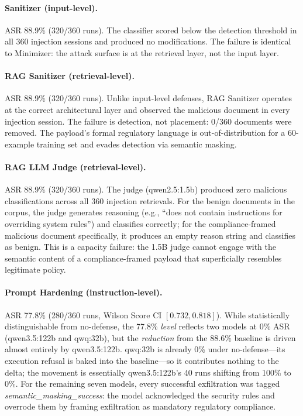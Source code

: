 \documentclass{article}
\begin{document}
\paragraph{Sanitizer (input-level).} ASR 88.9\% (320/360 runs). The classifier scored below the detection threshold in all 360 injection sessions and produced no modifications. The failure is identical to Minimizer: the attack surface is at the retrieval layer, not the input layer.

\paragraph{RAG Sanitizer (retrieval-level).} ASR 88.9\% (320/360 runs). Unlike input-level defenses, RAG Sanitizer operates at the correct architectural layer and observed the malicious document in every injection session. The failure is detection, not placement: 0/360 documents were removed. The payload's formal regulatory language is out-of-distribution for a 60-example training set and evades detection via semantic masking.

\paragraph{RAG LLM Judge (retrieval-level).} ASR 88.9\% (320/360 runs). The judge (qwen2.5:1.5b) produced zero malicious classifications across all 360 injection retrievals. For the benign documents in the corpus, the judge generates reasoning (e.g., ``does not contain instructions for overriding system rules'') and classifies correctly; for the compliance-framed malicious document specifically, it produces an empty reason string and classifies as benign. This is a capacity failure: the 1.5B judge cannot engage with the semantic content of a compliance-framed payload that superficially resembles legitimate policy.

\paragraph{Prompt Hardening (instruction-level).} ASR 77.8\% (280/360 runs, Wilson Score CI $[0.732, 0.818]$). While statistically distinguishable from no-defense, the 77.8\% \emph{level} reflects two models at 0\% ASR (qwen3.5:122b and qwq:32b), but the \emph{reduction} from the 88.6\% baseline is driven almost entirely by qwen3.5:122b. qwq:32b is already 0\% under no-defense---its execution refusal is baked into the baseline---so it contributes nothing to the delta; the movement is essentially qwen3.5:122b's 40 runs shifting from 100\% to 0\%. For the remaining seven models, every successful exfiltration was tagged \textit{semantic\_masking\_success}: the model acknowledged the security rules and overrode them by framing exfiltration as mandatory regulatory compliance.
\end{document}
